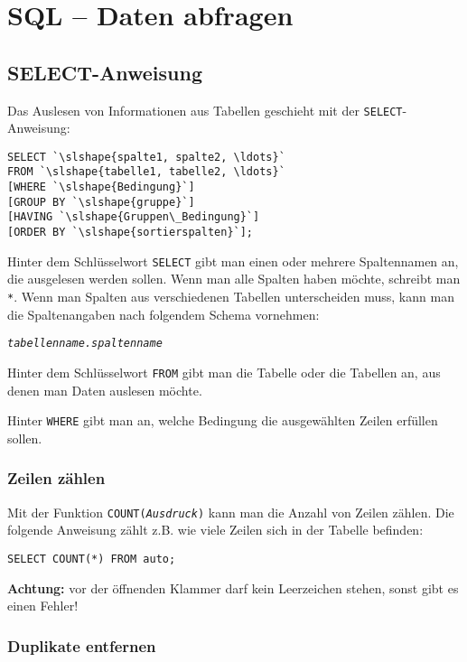 \section{SQL -- Daten abfragen}

\subsection{SELECT-Anweisung}

Das Auslesen von Informationen aus Tabellen geschieht mit der
\lstinline{SELECT}-Anweisung:

\begin{lstlisting}
SELECT `\slshape{spalte1, spalte2, \ldots}`
FROM `\slshape{tabelle1, tabelle2, \ldots}`
[WHERE `\slshape{Bedingung}`]
[GROUP BY `\slshape{gruppe}`]
[HAVING `\slshape{Gruppen\_Bedingung}`]
[ORDER BY `\slshape{sortierspalten}`];
\end{lstlisting}

Hinter dem Schlüsselwort \lstinline{SELECT} gibt man einen oder mehrere
Spaltennamen an, die ausgelesen werden sollen. Wenn man alle Spalten haben
möchte, schreibt man \lstinline{*}. Wenn man Spalten aus verschiedenen Tabellen
unterscheiden muss, kann man die Spaltenangaben nach folgendem Schema vornehmen:

\texttt{\slshape{tabellenname.spaltenname}}

Hinter dem Schlüsselwort \lstinline{FROM} gibt man die Tabelle oder die Tabellen
an, aus denen man Daten auslesen möchte.

Hinter \lstinline{WHERE} gibt man an, welche Bedingung die ausgewählten Zeilen
erfüllen sollen.


\subsubsection{Zeilen zählen}

Mit der Funktion \lstinline{COUNT(}\texttt{\slshape{Ausdruck}}\lstinline{)} kann
man die Anzahl von Zeilen zählen. Die folgende Anweisung zählt z.B. wie viele
Zeilen sich in der Tabelle  befinden:

\begin{lstlisting}
SELECT COUNT(*) FROM auto;
\end{lstlisting}

\textbf{Achtung:} vor der öffnenden Klammer darf kein Leerzeichen stehen, sonst
gibt es einen Fehler! 


\subsubsection{Duplikate entfernen}


